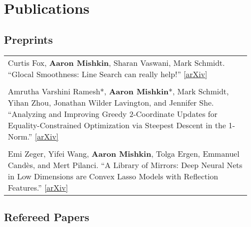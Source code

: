 \documentclass[10pt]{article}
\newcommand{\spacing}{\vspace{0.5cm}}
\begin{document}
\spacing

\section{Publications}

\vspace{1em}

\subsection*{Preprints}

\begin{tabular}{L{0.98\linewidth}}
    Curtis Fox, \textbf{Aaron Mishkin}, Sharan Vaswani, Mark Schmidt.
    ``Glocal Smoothness: Line Search can really help!'' \href{https://arxiv.org/abs/2506.12648}{[arXiv]}
    \\  \\
    Amrutha Varshini Ramesh*, \textbf{Aaron Mishkin}*, Mark Schmidt, Yihan Zhou,
    Jonathan Wilder Lavington, and Jennifer She.
    ``Analyzing and Improving Greedy 2-Coordinate Updates for Equality-Constrained Optimization via Steepest Descent in the 1-Norm.'' \href{https://arxiv.org/abs/2307.01169}{[arXiv]}
    \\  \\
    Emi Zeger, Yifei Wang, \textbf{Aaron Mishkin}, Tolga Ergen, Emmanuel Candès,
    and Mert Pilanci. ``A Library of Mirrors: Deep Neural Nets in Low Dimensions are
    Convex Lasso Models with Reflection Features.'' \href{https://arxiv.org/abs/2403.01046}{[arXiv]} \\
\end{tabular}

\subsection*{Refereed Papers}
\end{document}
